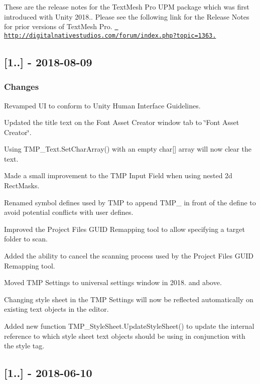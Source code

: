 These are the release notes for the Text\+Mesh Pro U\+PM package which was first introduced with Unity 2018.. Please see the following link for the Release Notes for prior versions of Text\+Mesh Pro. \href{http://digitalnativestudios.com/forum/index.php?topic=1363.0}{\texttt{ http\+://digitalnativestudios.\+com/forum/index.\+php?topic=1363.}}

\subsection*{\mbox{[}1..\mbox{]} -\/ 2018-\/08-\/09}

\subsubsection*{Changes}


\begin{DoxyItemize}
\item Revamped UI to conform to Unity Human Interface Guidelines.
\item Updated the title text on the Font Asset Creator window tab to \char`\"{}\+Font Asset Creator\char`\"{}.
\item Using T\+M\+P\+\_\+\+Text.\+Set\+Char\+Array() with an empty char\mbox{[}\mbox{]} array will now clear the text.
\item Made a small improvement to the T\+MP Input Field when using nested 2d Rect\+Masks.
\item Renamed symbol defines used by T\+MP to append T\+M\+P\+\_\+ in front of the define to avoid potential conflicts with user defines.
\item Improved the Project Files G\+U\+ID Remapping tool to allow specifying a target folder to scan.
\item Added the ability to cancel the scanning process used by the Project Files G\+U\+ID Remapping tool.
\item Moved T\+MP Settings to universal settings window in 2018. and above.
\item Changing style sheet in the T\+MP Settings will now be reflected automatically on existing text objects in the editor.
\item Added new function T\+M\+P\+\_\+\+Style\+Sheet.\+Update\+Style\+Sheet() to update the internal reference to which style sheet text objects should be using in conjunction with the style tag.
\end{DoxyItemize}

\subsection*{\mbox{[}1..\mbox{]} -\/ 2018-\/06-\/10}

